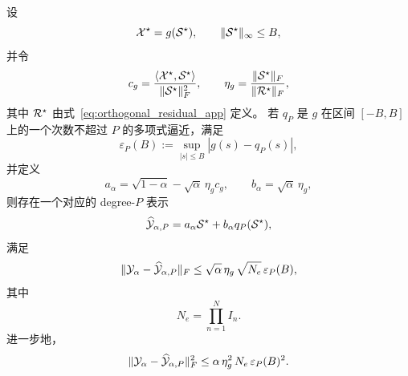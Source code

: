 \begin{corollary}
\label{cor:alpha_truncation_app}
设
\begin{equation}
\mathcal{X}^\star = g(\mathcal{S}^\star),
\qquad
\|\mathcal{S}^\star\|_\infty \le B,
\end{equation}
并令
\begin{equation}
c_g
=
\frac{\langle \mathcal{X}^\star,\mathcal{S}^\star\rangle}{\|\mathcal{S}^\star\|_F^2},
\qquad
\eta_g
=
\frac{\|\mathcal{S}^\star\|_F}{\|\mathcal{R}^\star\|_F},
\end{equation}
其中 $\mathcal{R}^\star$ 由式~\eqref{eq:orthogonal_residual_app} 定义。
若 $q_P$ 是 $g$ 在区间 $[-B,B]$ 上的一个次数不超过 $P$ 的多项式逼近，满足
\begin{equation}
\varepsilon_P(B)
:=
\sup_{|s|\le B}|g(s)-q_P(s)|,
\end{equation}
并定义
\begin{equation}
a_\alpha=\sqrt{1-\alpha}-\sqrt{\alpha}\,\eta_g c_g,
\qquad
b_\alpha=\sqrt{\alpha}\,\eta_g,
\end{equation}
则存在一个对应的 degree-$P$ 表示
\begin{equation}
\widehat{\mathcal{Y}}_{\alpha,P}
=
a_\alpha \mathcal{S}^\star + b_\alpha q_P(\mathcal{S}^\star),
\end{equation}
满足
\begin{equation}
\|\mathcal{Y}_\alpha-\widehat{\mathcal{Y}}_{\alpha,P}\|_F
\le
\sqrt{\alpha}\,\eta_g\,\sqrt{N_e}\,\varepsilon_P(B),
\label{eq:alpha_truncation_bound_app}
\end{equation}
其中
\begin{equation}
N_e=\prod_{n=1}^N I_n.
\end{equation}
进一步地，
\begin{equation}
\|\mathcal{Y}_\alpha-\widehat{\mathcal{Y}}_{\alpha,P}\|_F^2
\le
\alpha\,\eta_g^2\,N_e\,\varepsilon_P(B)^2.
\label{eq:alpha_truncation_bound_sq_app}
\end{equation}
\end{corollary}


